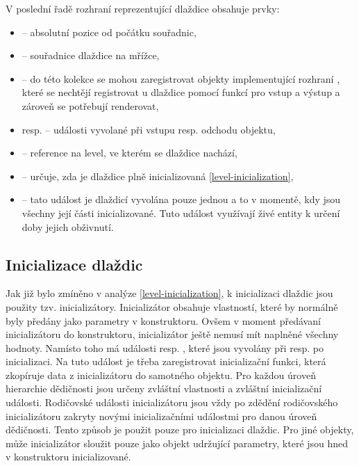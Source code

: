 V poslední řadě rozhraní reprezentující dlaždice obsahuje prvky: 
\begin{itemize}
\item {} -- absolutní pozice od počátku souřadnic,
\item {} -- souřadnice dlaždice na mřížce, 
\item {} -- do této kolekce se mohou zaregistrovat objekty implementující rozhraní , 
	které se nechtějí registrovat u dlaždice pomocí funkcí pro vstup a výstup a zároveň se potřebují renderovat, 
\item {} resp.  -- události vyvolané při vstupu resp. odchodu objektu,
\item {} -- reference na level, ve kterém se dlaždice nachází,
\item {} -- určuje, zda je dlaždice plně inicializovaná \vref{level-inicialization},
\item {} -- tato událost je dlaždicí vyvolána pouze jednou a to v momentě, kdy jsou všechny její části inicializované.
		Tuto událost využívají živé entity k určení doby jejich obživnutí.
\end{itemize}


\subsection{Inicializace dlaždic}
Jak již bylo zmíněno v analýze \vref{level-inicialization}, k inicializaci dlaždic jsou použity tzv. inicializátory. Inicializátor
obsahuje vlastností, které by normálně byly předány jako parametry v konstruktoru. Ovšem v moment předávaní
inicializátoru do konstruktoru, inicializátor ještě nemusí mít naplněné všechny hodnoty. Namísto toho má události 
resp. , které jsou vyvolány při resp. po inicializaci. Na tuto událost je třeba zaregistrovat
inicializační funkci, která zkopíruje data z inicializátoru do samotného objektu. Pro každou úroveň hierarchie
dědičnosti jsou určeny zvláštní vlastnosti a zvláštní inicializační události. Rodičovské události  inicializátoru jsou vždy
po zdědění rodičovského inicializátoru zakryty novými inicializačními událostmi pro danou úroveň dědičnosti.
Tento způsob je použit pouze pro inicializaci dlaždic. Pro jiné objekty, může inicializátor sloužit pouze jako 
objekt udržující parametry, které jsou hned v konstruktoru inicializované. 

